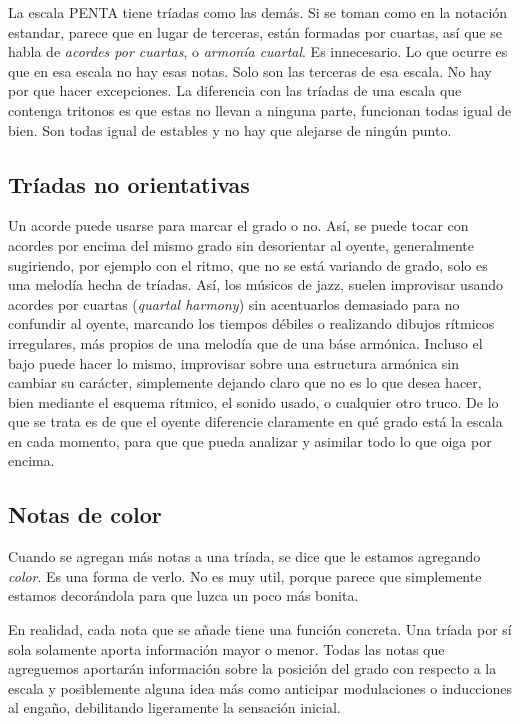 \documentclass[]{article}
\begin{document}
La escala \textsf{PENTA} tiene tríadas como las demás. Si se toman como en la notación estandar, parece que en lugar de terceras, están formadas por cuartas, así que se habla de \emph{acordes por cuartas}, o \emph{armonía cuartal}. Es innecesario. Lo que ocurre es que en esa escala no hay esas notas. Solo son las terceras de esa escala. No hay por que hacer excepciones. La diferencia con las tríadas de una escala que contenga tritonos es que estas no llevan a ninguna parte, funcionan todas igual de bien. Son todas igual de estables y no hay que alejarse de ningún punto.

\subsection{Tríadas no orientativas}

Un acorde puede usarse para marcar el grado o no. Así, se puede tocar con acordes por encima del mismo grado sin desorientar al oyente, generalmente sugiriendo, por ejemplo con el ritmo, que no se está variando de grado, solo es una melodía hecha de tríadas. Así, los músicos de jazz, suelen improvisar usando acordes por cuartas (\emph{quartal harmony}) sin acentuarlos demasiado para no confundir al oyente, marcando los tiempos débiles o realizando dibujos rítmicos irregulares, más propios de una melodía que de una báse armónica. Incluso el bajo puede hacer lo mismo, improvisar sobre una estructura armónica sin cambiar su carácter, simplemente dejando claro que no es lo que desea hacer, bien mediante el esquema rítmico, el sonido usado, o cualquier otro truco. De lo que se trata es de que el oyente diferencie claramente en qué grado está la escala en cada momento, para que que pueda analizar y asimilar todo lo que oiga por encima.

\subsection{Notas de color}

Cuando se agregan más notas a una tríada, se dice que le estamos agregando \emph{color}. Es una forma de verlo. No es muy util, porque parece que simplemente estamos decorándola para que luzca un poco más bonita.

En realidad, cada nota que se añade tiene una función concreta. Una tríada por sí sola solamente aporta información mayor o menor. Todas las notas que agreguemos aportarán información sobre la posición del grado con respecto a la escala y posiblemente alguna idea más como anticipar modulaciones o inducciones al engaño, debilitando ligeramente la sensación inicial.
\end{document}
